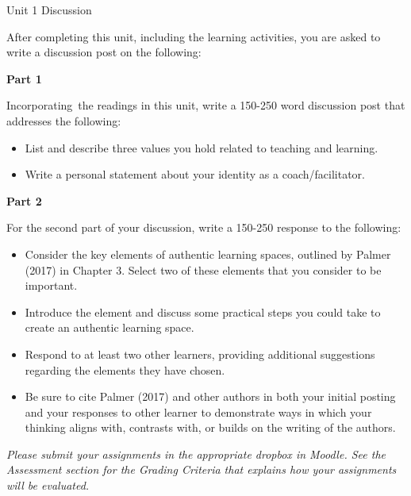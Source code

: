\documentclass[
]{book}
\providecommand{\tightlist}{%
  \setlength{\itemsep}{0pt}\setlength{\parskip}{0pt}}
\begin{document}
\begin{assessment}
{Unit 1 Discussion}

After completing this unit, including the learning activities, you are
asked to write a discussion post on the following:

\textbf{Part 1}

Incorporating~the readings in this unit, write a 150-250 word discussion
post that addresses the following:

\begin{itemize}
\tightlist
\item
  List and describe three values you hold related to teaching and
  learning.\\
\item
  Write a personal statement about your identity as a coach/facilitator.
\end{itemize}

\textbf{Part 2}

For the second part of your discussion, write a 150-250 response to the
following:

\begin{itemize}
\tightlist
\item
  Consider the key elements of authentic learning spaces, outlined by
  Palmer (2017) in Chapter 3. Select two of these elements that you
  consider to be important.\\
\item
  Introduce the element and discuss some practical steps you could take
  to create an authentic learning space.\\
\item
  Respond to at least two other learners, providing additional
  suggestions regarding the elements they have chosen.\\
\item
  Be sure to cite Palmer (2017) and other authors in both your initial
  posting and your responses to other learner to demonstrate ways in
  which your thinking aligns with, contrasts with, or builds on the
  writing of the authors.
\end{itemize}
\end{assessment}

\begin{caution}
\emph{Please submit your assignments in the appropriate dropbox in
Moodle. See the Assessment section for the Grading Criteria that
explains how your assignments will be evaluated.}
\end{caution}
\end{document}

